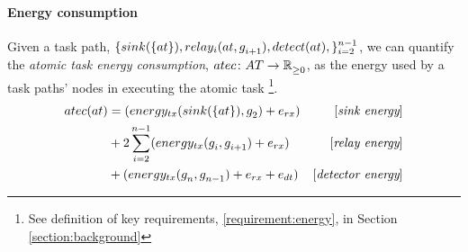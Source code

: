 \paragraph{Energy consumption}
\label{section:energy_consumption}

Given a task path, $\lbrace \functionSinkRoleAtomic{}{}, \functionRelayRole{i}{}{i+1}, \functionDetectorRole{}{},  \rbrace_{i=2}^{n-1}$, 
we can quantify the \textit{atomic task energy consumption}, $\formalAtomicTaskEnergyConsumption{}{}$, as the energy used by a task paths' nodes in executing the atomic task \footnote{See definition of key requirements, \ref{requirement:energy}, in Section \ref{section:background}}. 
\begin{equation}
\begin{aligned}
	\functionAtomicTaskEnergyConsumptionSignature{}{} 
	&= (\functionTransmissionEnergySink{}{} + \varReceiverEnergy{}{}) & [\textit{sink energy}]\\
	& + 2 \sum_{i=2}^{n-1} (\functionTransmissionEnergyRelay{i}{i+1} + \varReceiverEnergy{}{} )
	 & [\textit{relay energy}]\\
	&+ (
		\functionTransmissionEnergyDetector{n}{n-1}
		+ \varReceiverEnergy{}{}
		+ \varSensorEnergy{}{}
		)& [\textit{detector energy}]
\end{aligned}
\end{equation}

